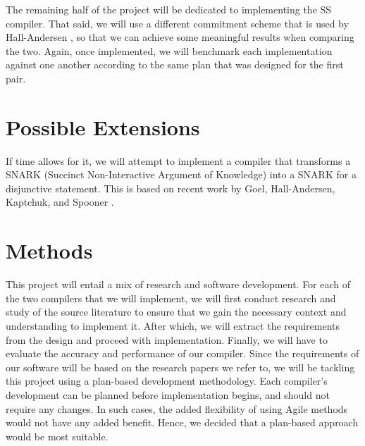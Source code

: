 The remaining half of the project will be dedicated to implementing the SS compiler. That said, we will use a different commitment scheme that is used by Hall-Andersen \cite{MHAStackSig}, so that we can achieve some meaningful results when comparing the two. Again, once implemented, we will benchmark each implementation against one another according to the same plan that was designed for the first pair.

\section{Possible Extensions}

If time allows for it, we will attempt to implement a compiler that transforms a SNARK (Succinct Non-Interactive Argument of Knowledge) into a SNARK for a disjunctive statement. This is based on recent work by Goel, Hall-Andersen, Kaptchuk, and Spooner \cite{SpeedStacking}.



\section{Methods}
This project will entail a mix of research and software development. For each of the two compilers that we will implement, we will first conduct research and study of the source literature to ensure that we gain the necessary context and understanding to implement it. After which, we will extract the requirements from the design and proceed with implementation. Finally, we will have to evaluate the accuracy and performance of our compiler. Since the requirements of our software will be based on the research papers we refer to, we will be tackling this project using a plan-based development methodology. Each compiler's development can be planned before implementation begins, and should not require any changes. In such cases, the added flexibility of using Agile methods would not have any added benefit. Hence, we decided that a plan-based approach would be most suitable.

